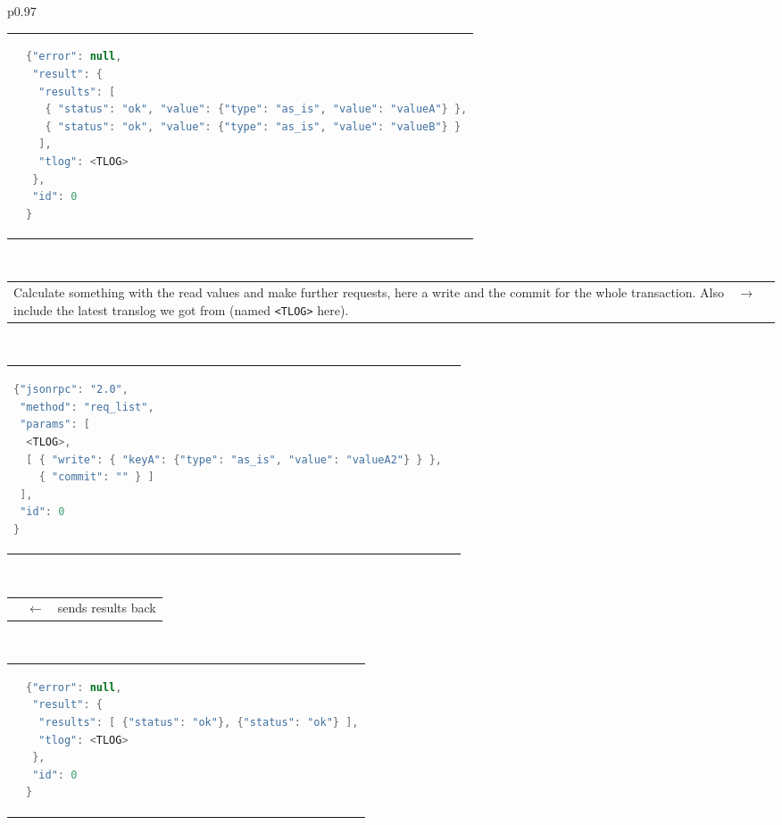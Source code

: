 \documentclass[a4paper]{scrreprt}
\newcommand{\code}[1]{\lstinline[basicstyle=\ttfamily]!#1!}
\begin{document}
\begin{longtable}{p{}}
\begin{tabular}{p{}p{}}
& 
\vspace{-1.5em}%
\begin{lstlisting}[language=java]
{"error": null,
 "result": {
  "results": [
   { "status": "ok", "value": {"type": "as_is", "value": "valueA"} },
   { "status": "ok", "value": {"type": "as_is", "value": "valueB"} }
  ],
  "tlog": <TLOG>
 },
 "id": 0
}
\end{lstlisting} \\
\end{tabular} \\
%
\begin{tabular}{p{}cp{}}
Calculate something with the read values and make further requests, here a
write and the commit for the whole transaction. Also include the latest
translog we got from \scalaris{} (named \code{<TLOG>} here). & $\to$ & \\
\end{tabular}\vspace{-1.5em} \\
%
\begin{tabular}{p{}p{}}
\vspace{-1.5em}%
\begin{lstlisting}[language=java]
{"jsonrpc": "2.0",
 "method": "req_list",
 "params": [
  <TLOG>,
  [ { "write": { "keyA": {"type": "as_is", "value": "valueA2"} } },
    { "commit": "" } ]
 ],
 "id": 0
}
\end{lstlisting}
& \\
\end{tabular}\vspace{-1em} \\
%
\begin{tabular}{p{}cp{}}
 & $\leftarrow$ & \hfill{}\scalaris{} sends results back \\
\end{tabular}\vspace{-1.5em} \\

\begin{tabular}{p{}p{}}
& 
\vspace{-1.5em}%
\begin{lstlisting}[language=java]
{"error": null,
 "result": {
  "results": [ {"status": "ok"}, {"status": "ok"} ],
  "tlog": <TLOG>
 },
 "id": 0
}
\end{lstlisting} \\
\end{tabular} \\
\end{longtable}
\end{document}

